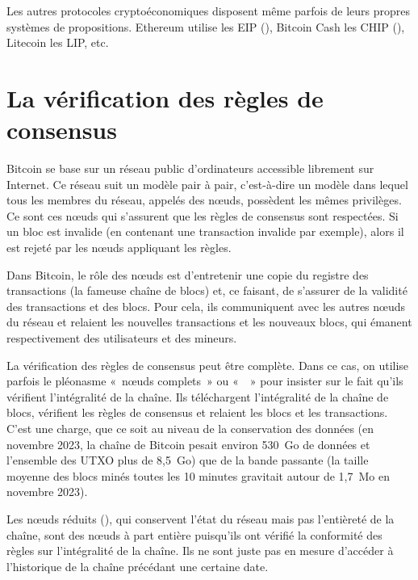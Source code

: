 Les autres protocoles cryptoéconomiques disposent même parfois de leurs propres systèmes de propositions. Ethereum utilise les EIP (), Bitcoin Cash les CHIP (), Litecoin les LIP, etc.

\section*{La vérification des règles de consensus}

Bitcoin se base sur un réseau public d'ordinateurs accessible librement sur Internet. Ce réseau suit un modèle pair à pair, c'est-à-dire un modèle dans lequel tous les membres du réseau, appelés des nœuds, possèdent les mêmes privilèges. Ce sont ces nœuds qui s'assurent que les règles de consensus sont respectées. Si un bloc est invalide (en contenant une transaction invalide par exemple), alors il est rejeté par les nœuds appliquant les règles.

Dans Bitcoin, le rôle des nœuds est d'entretenir une copie du registre des transactions (la fameuse chaîne de blocs) et, ce faisant, de s'assurer de la validité des transactions et des blocs. Pour cela, ils communiquent avec les autres nœuds du réseau et relaient les nouvelles transactions et les nouveaux blocs, qui émanent respectivement des utilisateurs et des mineurs.

La vérification des règles de consensus peut être complète. Dans ce cas, on utilise parfois le pléonasme «~nœuds complets~» ou «~~» pour insister sur le fait qu'ils vérifient l'intégralité de la chaîne. Ils téléchargent l'intégralité de la chaîne de blocs, vérifient les règles de consensus et relaient les blocs et les transactions. C'est une charge, que ce soit au niveau de la conservation des données (en novembre 2023, la chaîne de Bitcoin pesait environ 530~Go de données et l'ensemble des UTXO plus de 8,5~Go) que de la bande passante (la taille moyenne des blocs minés toutes les 10 minutes gravitait autour de 1,7~Mo en novembre 2023).

Les nœuds réduits (), qui conservent l'état du réseau mais pas l'entièreté de la chaîne, sont des nœuds à part entière puisqu'ils ont vérifié la conformité des règles sur l'intégralité de la chaîne. Ils ne sont juste pas en mesure d'accéder à l'historique de la chaîne précédant une certaine date.

